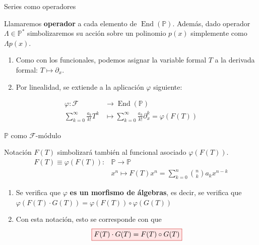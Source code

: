 \documentclass{beamer}
\newenvironment{definicion}[1][]{
  \begin{tcolorbox}[colback=red!10, colframe=red!80!black, title=Definición\ #1, fonttitle=\bfseries]
}{
  \end{tcolorbox}
}
\newcommand{\rboxed}[1]{%
  \fcolorbox{red!80!black}{red!10}{$#1$}%
}
\newcommand{\F}{\mathscr{F}} %
\newcommand{\poly}{\mathbb{P}} %
\DeclareMathOperator*{\End}{End} %
\begin{document}
\begin{frame}{Series como operadores}
  \begin{definicion}
    Llamaremos \textbf{operador} a cada elemento de $\End(\poly)$. Además, dado operador $\Lambda \in \poly^*$ simbolizaremos su acción sobre un polinomio $p(x)$ simplemente como $\Lambda p(x)$.
  \end{definicion}
  \begin{enumerate}
    \item Como con los funcionales, podemos asignar la variable formal $T$ a la derivada formal: $T \mapsto \partial_{x}$.
    \item Por linealidad, se extiende a la aplicación $\varphi$ siguiente:
  \end{enumerate}
  \begin{block}{}
    \begin{align*}
      \varphi \colon \F & \longrightarrow \End(\poly)\\
      \sum_{k = 0}^\infty \frac{a_k}{k!}T^k & \mapsto \sum_{k = 0}^\infty \frac{a_k}{k!} \partial_{x}^k = \varphi(F(T))
    \end{align*}
  \end{block}
\end{frame}

\begin{frame}{$\poly$ como $\F$-módulo}
  \begin{block}{Notación}
    $F(T)$ simbolizará también al funcional asociado $\varphi(F(T))$.
    \begin{align*}
    F(T) \equiv \varphi(F(T)) \colon & \poly \longrightarrow \poly \nonumber \\
    & x^n \mapsto F(T)x^n = \sum_{k=0}^n \binom{n}{k}a_k x^{n-k}
    \end{align*}
  \end{block}

  \begin{enumerate}
    \item Se verifica que $\varphi$ \textbf{es un morfismo de álgebras}, es decir, se verifica que $\varphi(F(T) \cdot G(T)) = \varphi(F(T)) \circ \varphi(G(T))$
    \item Con esta notación, esto se corresponde con que
      \begin{equation*}
        \rboxed{F(T) \cdot G(T) = F(T) \circ G(T)}
      \end{equation*}
  \end{enumerate}
\end{frame}
\end{document}
